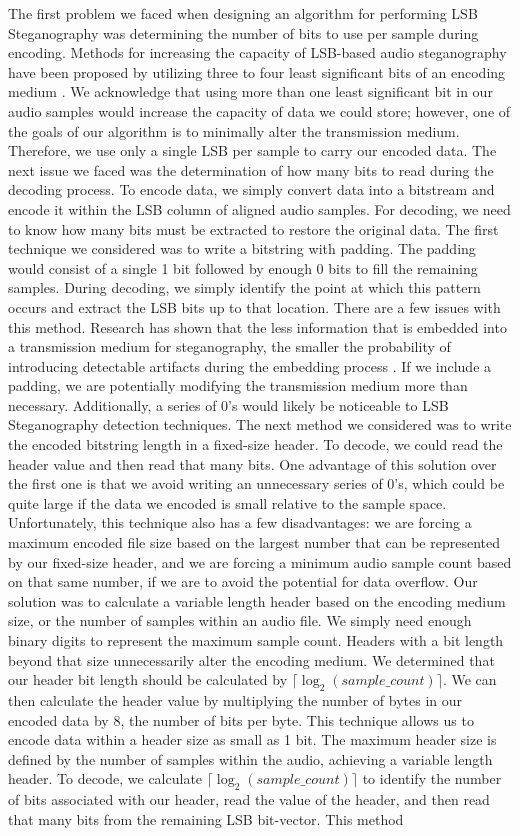 The first problem we faced when designing an algorithm for performing LSB Steganography was determining the number of bits to use per sample during encoding. Methods for increasing the capacity of LSB-based audio steganography have been proposed by utilizing three to four least significant bits of an encoding medium \cite{paper4}. We acknowledge that using more than one least significant bit in our audio samples would increase the capacity of data we could store; however, one of the goals of our algorithm is to minimally alter the transmission medium. Therefore, we use only a single LSB per sample to carry our encoded data. The next issue we faced was the determination of how many bits to read during the decoding process. To encode data, we simply convert data into a bitstream and encode it within the LSB column of aligned audio samples. For decoding, we need to know how many bits must be extracted to restore the original data. The first technique we considered was to write a bitstring with padding. The padding would consist of a single 1 bit followed by enough 0 bits to fill the remaining samples. During decoding, we simply identify the point at which this pattern occurs and extract the LSB bits up to that location. There are a few issues with this method. Research has shown that the less information that is embedded into a transmission medium for steganography, the smaller the probability of introducing detectable artifacts during the embedding process \cite{paper1}. If we include a padding, we are potentially modifying the transmission medium more than necessary. Additionally, a series of 0's would likely be noticeable to LSB Steganography detection techniques. The next method we considered was to write the encoded bitstring length in a fixed-size header. To decode, we could read the header value and then read that many bits. One advantage of this solution over the first one is that we avoid writing an unnecessary series of 0's, which could be quite large if the data we encoded is small relative to the sample space. Unfortunately, this technique also has a few disadvantages: we are forcing a maximum encoded file size based on the largest number that can be represented by our fixed-size header, and we are forcing a minimum audio sample count based on that same number, if we are to avoid the potential for data overflow. Our solution was to calculate a variable length header based on the encoding medium size, or the number of samples within an audio file. We simply need enough binary digits to represent the maximum sample count. Headers with a bit length beyond that size unnecessarily alter the encoding medium. We determined that our header bit length should be calculated by $\lceil\log_2(\textit{sample\_count})\rceil$. We can then calculate the header value by multiplying the number of bytes in our encoded data by 8, the number of bits per byte. This technique allows us to encode data within a header size as small as 1 bit. The maximum header size is defined by the number of samples within the audio, achieving a variable length header. To decode, we calculate $\lceil\log_2(\textit{sample\_count})\rceil$ to identify the number of bits associated with our header, read the value of the header, and then read that many bits from the remaining LSB bit-vector. This method 